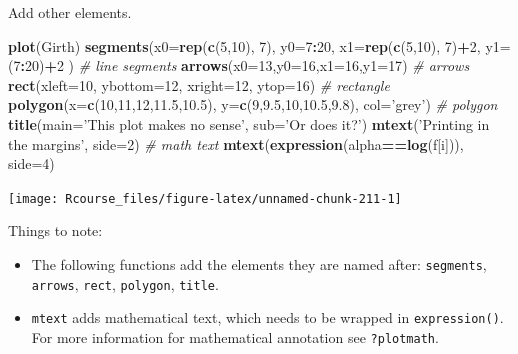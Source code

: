 \documentclass[]{book}
\newenvironment{Shaded}{\begin{snugshade}}{\end{snugshade}}
\newcommand{\KeywordTok}[1]{\textcolor[rgb]{0.13,0.29,0.53}{\textbf{#1}}}
\newcommand{\DataTypeTok}[1]{\textcolor[rgb]{0.13,0.29,0.53}{#1}}
\newcommand{\DecValTok}[1]{\textcolor[rgb]{0.00,0.00,0.81}{#1}}
\newcommand{\FloatTok}[1]{\textcolor[rgb]{0.00,0.00,0.81}{#1}}
\newcommand{\StringTok}[1]{\textcolor[rgb]{0.31,0.60,0.02}{#1}}
\newcommand{\CommentTok}[1]{\textcolor[rgb]{0.56,0.35,0.01}{\textit{#1}}}
\newcommand{\OperatorTok}[1]{\textcolor[rgb]{0.81,0.36,0.00}{\textbf{#1}}}
\newcommand{\NormalTok}[1]{#1}
\providecommand{\tightlist}{%
  \setlength{\itemsep}{0pt}\setlength{\parskip}{0pt}}
\theoremstyle{definition}
\theoremstyle{definition}
\theoremstyle{definition}
\theoremstyle{remark}
\begin{document}
Add other elements.

\begin{Shaded}
\begin{Highlighting}[]
\KeywordTok{plot}\NormalTok{(Girth)}
\KeywordTok{segments}\NormalTok{(}\DataTypeTok{x0=}\KeywordTok{rep}\NormalTok{(}\KeywordTok{c}\NormalTok{(}\DecValTok{5}\NormalTok{,}\DecValTok{10}\NormalTok{), }\DecValTok{7}\NormalTok{), }\DataTypeTok{y0=}\DecValTok{7}\OperatorTok{:}\DecValTok{20}\NormalTok{, }\DataTypeTok{x1=}\KeywordTok{rep}\NormalTok{(}\KeywordTok{c}\NormalTok{(}\DecValTok{5}\NormalTok{,}\DecValTok{10}\NormalTok{), }\DecValTok{7}\NormalTok{)}\OperatorTok{+}\DecValTok{2}\NormalTok{, }\DataTypeTok{y1=}\NormalTok{(}\DecValTok{7}\OperatorTok{:}\DecValTok{20}\NormalTok{)}\OperatorTok{+}\DecValTok{2}\NormalTok{ ) }\CommentTok{# line segments}
\KeywordTok{arrows}\NormalTok{(}\DataTypeTok{x0=}\DecValTok{13}\NormalTok{,}\DataTypeTok{y0=}\DecValTok{16}\NormalTok{,}\DataTypeTok{x1=}\DecValTok{16}\NormalTok{,}\DataTypeTok{y1=}\DecValTok{17}\NormalTok{) }\CommentTok{# arrows}
\KeywordTok{rect}\NormalTok{(}\DataTypeTok{xleft=}\DecValTok{10}\NormalTok{, }\DataTypeTok{ybottom=}\DecValTok{12}\NormalTok{,  }\DataTypeTok{xright=}\DecValTok{12}\NormalTok{, }\DataTypeTok{ytop=}\DecValTok{16}\NormalTok{) }\CommentTok{# rectangle}
\KeywordTok{polygon}\NormalTok{(}\DataTypeTok{x=}\KeywordTok{c}\NormalTok{(}\DecValTok{10}\NormalTok{,}\DecValTok{11}\NormalTok{,}\DecValTok{12}\NormalTok{,}\FloatTok{11.5}\NormalTok{,}\FloatTok{10.5}\NormalTok{), }\DataTypeTok{y=}\KeywordTok{c}\NormalTok{(}\DecValTok{9}\NormalTok{,}\FloatTok{9.5}\NormalTok{,}\DecValTok{10}\NormalTok{,}\FloatTok{10.5}\NormalTok{,}\FloatTok{9.8}\NormalTok{), }\DataTypeTok{col=}\StringTok{'grey'}\NormalTok{) }\CommentTok{# polygon}
\KeywordTok{title}\NormalTok{(}\DataTypeTok{main=}\StringTok{'This plot makes no sense'}\NormalTok{, }\DataTypeTok{sub=}\StringTok{'Or does it?'}\NormalTok{) }
\KeywordTok{mtext}\NormalTok{(}\StringTok{'Printing in the margins'}\NormalTok{, }\DataTypeTok{side=}\DecValTok{2}\NormalTok{) }\CommentTok{# math text}
\KeywordTok{mtext}\NormalTok{(}\KeywordTok{expression}\NormalTok{(alpha}\OperatorTok{==}\KeywordTok{log}\NormalTok{(f[i])), }\DataTypeTok{side=}\DecValTok{4}\NormalTok{)}
\end{Highlighting}
\end{Shaded}

\texttt{[image: Rcourse\_files/figure-latex/unnamed-chunk-211-1]}

Things to note:

\begin{itemize}
\tightlist
\item
  The following functions add the elements they are named after:
  \texttt{segments}, \texttt{arrows}, \texttt{rect}, \texttt{polygon},
  \texttt{title}.
\item
  \texttt{mtext} adds mathematical text, which needs to be wrapped in
  \texttt{expression()}. For more information for mathematical
  annotation see \texttt{?plotmath}.
\end{itemize}
\end{document}
